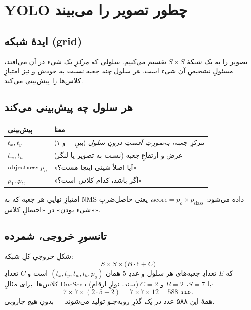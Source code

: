 \documentclass[12pt,a4paper]{article}
\begin{document}
\section{YOLO چطور تصویر را می‌بیند}

\subsection{ایدهٔ شبکه (grid)}

تصویر را به یک شبکهٔ $S\times S$ تقسیم می‌کنیم. سلولی که \emph{مرکزِ} یک شیء در آن می‌افتد، مسئولِ تشخیصِ آن شیء است. هر سلول چند جعبه نسبت به خودش و نیز امتیازِ کلاس‌ها را پیش‌بینی می‌کند.

\subsection{هر سلول چه پیش‌بینی می‌کند}

\begin{center}
\begin{tabular}{@{}ll@{}}
\hline
\textbf{پیش‌بینی} & \textbf{معنا} \\
\hline
$t_x,t_y$ & مرکزِ جعبه، \emph{به‌صورتِ آفستِ درونِ سلول} (بینِ ۰ و ۱) \\
$t_w,t_h$ & عرض و ارتفاعِ جعبه (نسبت به تصویر یا لنگر) \\
objectness $p_o$ & «آیا اصلاً شیئی اینجا هست؟» \\
$p_1..p_C$ & «اگر باشد، کدام کلاس است؟» \\
\hline
\end{tabular}
\end{center}

امتیازِ نهاییِ هر جعبه که به NMS داده می‌شود: $\text{score}=p_o\times p_{\text{class}}$، یعنی حاصل‌ضربِ «شیء بودن» در «احتمالِ کلاس».

\subsection{تانسورِ خروجی، شمرده}

\begin{riyazi}
شکلِ خروجیِ کلِ شبکه:
\[
S\times S\times\big(B\cdot5 + C\big)
\]
که $B$ تعدادِ جعبه‌های هر سلول و عددِ $5$ همان $(t_x,t_y,t_w,t_h,p_o)$ است و $C$ تعدادِ کلاس‌ها. برای مثالِ DocScan با $S=7$، $B=2$ و $C=2$ (سند، نوارِ ارقام):
\[
7\times7\times(2\cdot5+2) = 7\times7\times12 = 588 \text{ عدد.}
\]
همهٔ این ۵۸۸ عدد در \emph{یک} گذرِ رو‌به‌جلو تولید می‌شوند — بدونِ هیچ جاروبی.
\end{riyazi}
\end{document}
